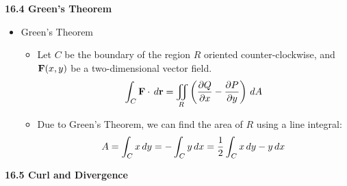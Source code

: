 \newpage

\centerline{\bf 16.4 Green's Theorem}

  \begin{itemize}
    \item Green's Theorem
      \begin{itemize}
        \item Let $C$ be the boundary of the region $R$ oriented counter-clockwise, and $\mathbf{F}(x,y)$ be a two-dimensional vector field.
          \[
            \int_C \mathbf{F}\cdot\,d{\mathbf{r}} = \iint_R \left(\frac{\partial Q}{\partial x}-\frac{\partial P}{\partial y}\right)\,d{A}
          \]
        \item Due to Green's Theorem, we can find the area of $R$ using a line integral:
          \[ 
            A = \int_C x\,d{y} = -\int_C y\,d{x} = \frac{1}{2}\int_C x\,d{y}-y\,d{x}
          \]
      \end{itemize}
  \end{itemize}

\newpage

\centerline{\bf 16.5 Curl and Divergence}


